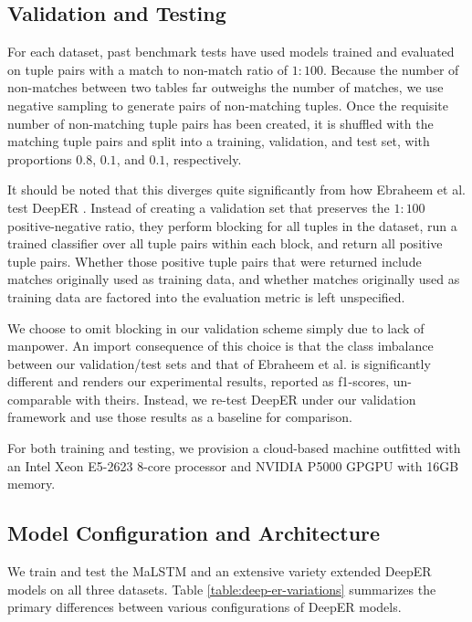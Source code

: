 \documentclass{proc}
\begin{document}
\subsection{Validation and Testing}

For each dataset, past benchmark tests have used models trained and evaluated on tuple pairs with a match to non-match ratio of $1:100$. Because the number of non-matches between two tables far outweighs the number of matches, we use negative sampling to generate pairs of non-matching tuples. Once the requisite number of non-matching tuple pairs has been created, it is shuffled with the matching tuple pairs and split into a training, validation, and test set, with proportions $0.8$, $0.1$, and $0.1$, respectively.

It should be noted that this diverges quite significantly from how Ebraheem et al. test DeepER \cite{ebraheem-deep-er}. Instead of creating a validation set that preserves the $1:100$ positive-negative ratio, they perform blocking for all tuples in the dataset, run a trained classifier over all tuple pairs within each block, and return all positive tuple pairs. Whether those positive tuple pairs that were returned include matches originally used as training data, and whether matches originally used as training data are factored into the evaluation metric is left unspecified.

We choose to omit blocking in our validation scheme simply due to lack of manpower. An import consequence of this choice is that the class imbalance between our validation/test sets and that of Ebraheem et al.\cite{ebraheem-deep-er} is significantly different and renders our experimental results, reported as f1-scores, un-comparable with theirs. Instead, we re-test DeepER under our validation framework and use those results as a baseline for comparison.

For both training and testing, we provision a cloud-based machine outfitted with an Intel Xeon E5-2623 8-core processor and NVIDIA P5000 GPGPU with 16GB memory.

\subsection{Model Configuration and Architecture}

We train and test the MaLSTM and an extensive variety extended DeepER models on all three datasets. Table \ref{table:deep-er-variations} summarizes the primary differences between various configurations of DeepER models.
\end{document}
